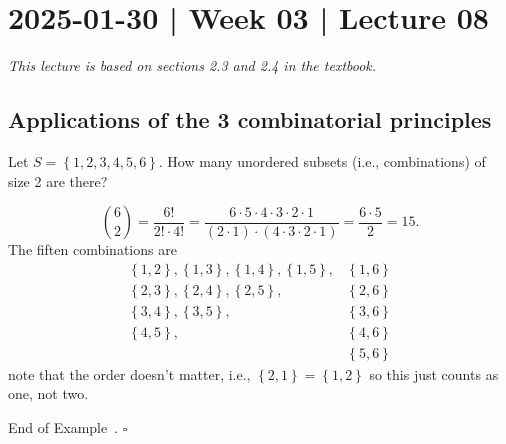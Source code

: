 \documentclass[10pt]{article}
\theoremstyle{definition}
\newtheorem{example}[theorem]{Example}
\renewenvironment{example}
{\begin{oldexample}}
  {\par\smallskip\hfill   End of Example~\theexample. $\square$    \par\end{oldexample}}
\newcommand{\1}[1]{\textbf{1}_{\left[#1\right]}} %
\begin{document}
\section{2025-01-30 | Week 03 | Lecture 08}

\textit{This lecture is based on sections 2.3 and 2.4 in the textbook.}


\subsection{Applications of the 3 combinatorial principles}
\begin{example}
  Let $S = \left\{1,2,3,4,5,6\right\}$. How many unordered subsets (i.e.,
  combinations) of size 2 are there?

  \begin{equation*}
    {6\choose 2} = \frac{6!}{2! \cdot 4!} = \frac{6\cdot5\cdot4\cdot3\cdot2\cdot1}{\left(2\cdot1\right) \cdot \left(4\cdot3\cdot2\cdot1\right)} = \frac{6\cdot5}{2} = 15.
  \end{equation*}
  The fiften combinations are
  \begin{align*}
    \left\{1,2\right\}, \left\{1,3\right\}, \left\{1,4\right\}, \left\{1,5\right\}, &\left\{1,6\right\} \\
    \left\{2,3\right\}, \left\{2,4\right\}, \left\{2,5\right\}, &\left\{2,6\right\} \\
    \left\{3,4\right\}, \left\{3,5\right\}, &\left\{3,6\right\} \\
    \left\{4,5\right\}, &\left\{4,6\right\} \\
    & \left\{5,6\right\}
  \end{align*}
  note that the order doesn't matter, i.e., $\left\{2,1\right\}=\left\{1,2\right\}$ so this just counts
  as one, not two.

\end{example}
\end{document}

